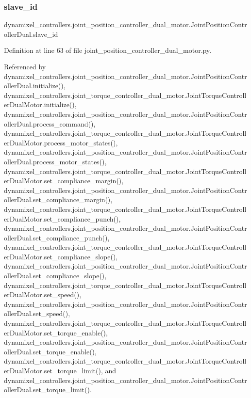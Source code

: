 \subsubsection{\texorpdfstring{slave\+\_\+id}{slave\_id}}
{\footnotesize\ttfamily dynamixel\+\_\+controllers.\+joint\+\_\+position\+\_\+controller\+\_\+dual\+\_\+motor.\+Joint\+Position\+Controller\+Dual.\+slave\+\_\+id}



Definition at line 63 of file joint\+\_\+position\+\_\+controller\+\_\+dual\+\_\+motor.\+py.



Referenced by dynamixel\+\_\+controllers.\+joint\+\_\+position\+\_\+controller\+\_\+dual\+\_\+motor.\+Joint\+Position\+Controller\+Dual.\+initialize(), dynamixel\+\_\+controllers.\+joint\+\_\+torque\+\_\+controller\+\_\+dual\+\_\+motor.\+Joint\+Torque\+Controller\+Dual\+Motor.\+initialize(), dynamixel\+\_\+controllers.\+joint\+\_\+position\+\_\+controller\+\_\+dual\+\_\+motor.\+Joint\+Position\+Controller\+Dual.\+process\+\_\+command(), dynamixel\+\_\+controllers.\+joint\+\_\+torque\+\_\+controller\+\_\+dual\+\_\+motor.\+Joint\+Torque\+Controller\+Dual\+Motor.\+process\+\_\+motor\+\_\+states(), dynamixel\+\_\+controllers.\+joint\+\_\+position\+\_\+controller\+\_\+dual\+\_\+motor.\+Joint\+Position\+Controller\+Dual.\+process\+\_\+motor\+\_\+states(), dynamixel\+\_\+controllers.\+joint\+\_\+torque\+\_\+controller\+\_\+dual\+\_\+motor.\+Joint\+Torque\+Controller\+Dual\+Motor.\+set\+\_\+compliance\+\_\+margin(), dynamixel\+\_\+controllers.\+joint\+\_\+position\+\_\+controller\+\_\+dual\+\_\+motor.\+Joint\+Position\+Controller\+Dual.\+set\+\_\+compliance\+\_\+margin(), dynamixel\+\_\+controllers.\+joint\+\_\+torque\+\_\+controller\+\_\+dual\+\_\+motor.\+Joint\+Torque\+Controller\+Dual\+Motor.\+set\+\_\+compliance\+\_\+punch(), dynamixel\+\_\+controllers.\+joint\+\_\+position\+\_\+controller\+\_\+dual\+\_\+motor.\+Joint\+Position\+Controller\+Dual.\+set\+\_\+compliance\+\_\+punch(), dynamixel\+\_\+controllers.\+joint\+\_\+torque\+\_\+controller\+\_\+dual\+\_\+motor.\+Joint\+Torque\+Controller\+Dual\+Motor.\+set\+\_\+compliance\+\_\+slope(), dynamixel\+\_\+controllers.\+joint\+\_\+position\+\_\+controller\+\_\+dual\+\_\+motor.\+Joint\+Position\+Controller\+Dual.\+set\+\_\+compliance\+\_\+slope(), dynamixel\+\_\+controllers.\+joint\+\_\+torque\+\_\+controller\+\_\+dual\+\_\+motor.\+Joint\+Torque\+Controller\+Dual\+Motor.\+set\+\_\+speed(), dynamixel\+\_\+controllers.\+joint\+\_\+position\+\_\+controller\+\_\+dual\+\_\+motor.\+Joint\+Position\+Controller\+Dual.\+set\+\_\+speed(), dynamixel\+\_\+controllers.\+joint\+\_\+torque\+\_\+controller\+\_\+dual\+\_\+motor.\+Joint\+Torque\+Controller\+Dual\+Motor.\+set\+\_\+torque\+\_\+enable(), dynamixel\+\_\+controllers.\+joint\+\_\+position\+\_\+controller\+\_\+dual\+\_\+motor.\+Joint\+Position\+Controller\+Dual.\+set\+\_\+torque\+\_\+enable(), dynamixel\+\_\+controllers.\+joint\+\_\+torque\+\_\+controller\+\_\+dual\+\_\+motor.\+Joint\+Torque\+Controller\+Dual\+Motor.\+set\+\_\+torque\+\_\+limit(), and dynamixel\+\_\+controllers.\+joint\+\_\+position\+\_\+controller\+\_\+dual\+\_\+motor.\+Joint\+Position\+Controller\+Dual.\+set\+\_\+torque\+\_\+limit().

